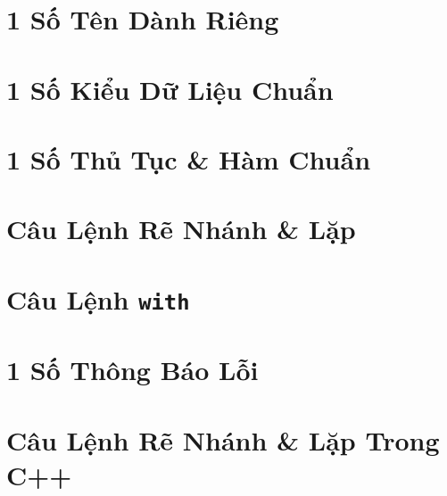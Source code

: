 \documentclass[oneside]{book}
\numberwithin{equation}{section}
\begin{document}

\section{1 Số Tên Dành Riêng}


\section{1 Số Kiểu Dữ Liệu Chuẩn}


\section{1 Số Thủ Tục \& Hàm Chuẩn}


\section{Câu Lệnh Rẽ Nhánh \& Lặp}


\section{Câu Lệnh \texttt{with}}


\section{1 Số Thông Báo Lỗi}


\section{Câu Lệnh Rẽ Nhánh \& Lặp Trong C++}

\end{document}
